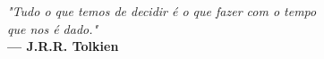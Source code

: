 \begin{epigrafe}
    \vspace*{\fill}
    \begin{flushright}
        \textit{"Tudo o que temos de decidir é o que fazer com o tempo\\
        que nos é dado."}\\
        \textbf{--- J.R.R. Tolkien}
    \end{flushright}
\end{epigrafe}